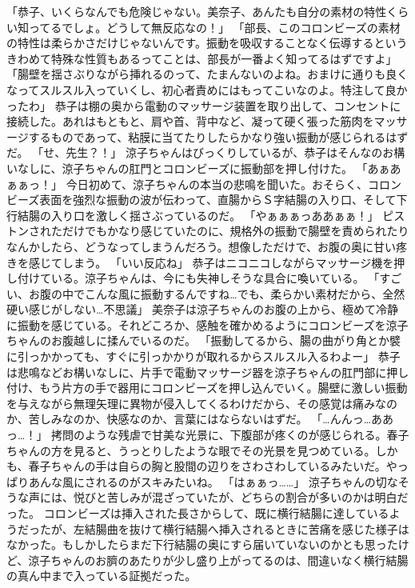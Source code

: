 「恭子、いくらなんでも危険じゃない。美奈子、あんたも自分の素材の特性くらい知ってるでしょ。どうして無反応なの！」
「部長、このコロンビーズの素材の特性は柔らかさだけじゃないんです。振動を吸収することなく伝導するというきわめて特殊な性質もあるってことは、部長が一番よく知ってるはずですよ」
「腸壁を揺さぶりながら挿れるのって、たまんないのよね。おまけに通りも良くなってスルスル入っていくし、初心者責めにはもってこいなのよ。特注して良かったわ」
恭子は棚の奥から電動のマッサージ装置を取り出して、コンセントに接続した。あれはもともと、肩や首、背中など、凝って硬く張った筋肉をマッサージするものであって、粘膜に当てたりしたらかなり強い振動が感じられるはずだ。
「せ、先生？！」
涼子ちゃんはびっくりしているが、恭子はそんなのお構いなしに、涼子ちゃんの肛門とコロンビーズに振動部を押し付けた。
「あぁあぁぁっ！」
今日初めて、涼子ちゃんの本当の悲鳴を聞いた。おそらく、コロンビーズ表面を強烈な振動の波が伝わって、直腸からＳ字結腸の入り口、そして下行結腸の入り口を激しく揺さぶっているのだ。
「やぁぁぁっああぁぁ！」
ピストンされただけでもかなり感じていたのに、規格外の振動で腸壁を責められたりなんかしたら、どうなってしまうんだろう。想像しただけで、お腹の奥に甘い疼きを感じてしまう。
「いい反応ね」
恭子はニコニコしながらマッサージ機を押し付けている。涼子ちゃんは、今にも失神しそうな具合に喚いている。
「すごい、お腹の中でこんな風に振動するんですね…でも、柔らかい素材だから、全然硬い感じがしない…不思議」
美奈子は涼子ちゃんのお腹の上から、極めて冷静に振動を感じている。それどころか、感触を確かめるようにコロンビーズを涼子ちゃんのお腹越しに揉んでいるのだ。
「振動してるから、腸の曲がり角とか襞に引っかかっても、すぐに引っかかりが取れるからスルスル入るわよー」
恭子は悲鳴などお構いなしに、片手で電動マッサージ器を涼子ちゃんの肛門部に押し付け、もう片方の手で器用にコロンビーズを押し込んでいく。腸壁に激しい振動を与えながら無理矢理に異物が侵入してくるわけだから、その感覚は痛みなのか、苦しみなのか、快感なのか、言葉にはならないはずだ。
「…んんっ…ああっ…！」
拷問のような残虐で甘美な光景に、下腹部が疼くのが感じられる。春子ちゃんの方を見ると、うっとりしたような眼でその光景を見つめている。しかも、春子ちゃんの手は自らの胸と股間の辺りをさわさわしているみたいだ。やっぱりあんな風にされるのがスキみたいね。
「はぁぁっ……」
涼子ちゃんの切なそうな声には、悦びと苦しみが混ざっていたが、どちらの割合が多いのかは明白だった。
コロンビーズは挿入された長さからして、既に横行結腸に達しているようだったが、左結腸曲を抜けて横行結腸へ挿入されるときに苦痛を感じた様子はなかった。もしかしたらまだ下行結腸の奥にすら届いていないのかとも思ったけど、涼子ちゃんのお臍のあたりが少し盛り上がってるのは、間違いなく横行結腸の真ん中まで入っている証拠だった。
